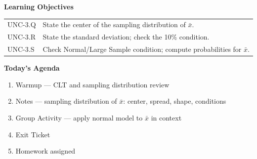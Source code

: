 \documentclass[10pt]{article}
\begin{document}
\namedateperiod

\begin{objectivebox}
\textbf{Learning Objectives}

\medskip
\begin{tabularx}{\linewidth}{@{} l X @{}}
UNC-3.Q & State the center of the sampling distribution of $\bar{x}$.\\[4pt]
UNC-3.R & State the standard deviation; check the 10\% condition.\\[4pt]
UNC-3.S & Check Normal/Large Sample condition; compute probabilities for $\bar{x}$.\\
\end{tabularx}
\end{objectivebox}

\begin{tocbox}
\textbf{Today's Agenda}
\begin{enumerate}
  \item Warmup — CLT and sampling distribution review
  \item Notes — sampling distribution of $\bar{x}$: center, spread, shape, conditions
  \item Group Activity — apply normal model to $\bar{x}$ in context
  \item Exit Ticket
  \item Homework assigned
\end{enumerate}
\end{tocbox}
\end{document}
